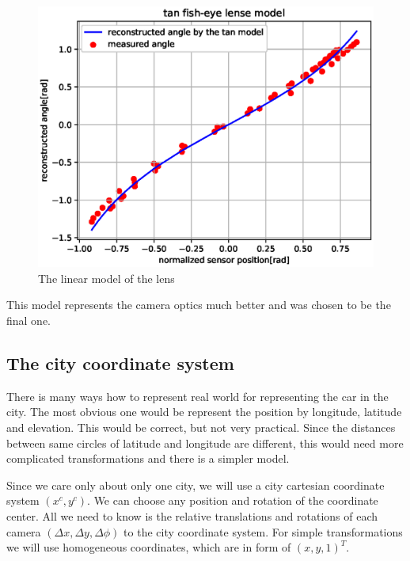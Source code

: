 \documentclass[a4paper,12pt,titlepage, twoside]{article}
\numberwithin{figure}{section}
\begin{document}
\begin{figure}[h!]
\centering
\includegraphics[width=1\linewidth]{fig/tan_model2.eps}
\caption{The linear model of the lens}
\label{fig:linear_model}
\end{figure}

This model represents the camera optics much better and was chosen to be the final one.

\subsection{The city coordinate system}

There is many ways how to represent real world for representing the car in the city. The most obvious one would be represent the position by longitude, latitude and elevation. This would be correct, but not very practical. Since the distances between same circles of latitude and longitude are different, this would need more complicated transformations and there is a simpler model. 

Since we care only about only one city, we will use a city cartesian coordinate system $(x^c, y^c)$. We can choose any position and rotation of the coordinate center. All we need to know is the relative translations and rotations of each camera $(\Delta x, \Delta y, \Delta\phi)$ to the city coordinate system. For simple transformations we will use homogeneous coordinates, which are in form of $(x, y, 1)^T$. 
\end{document}
